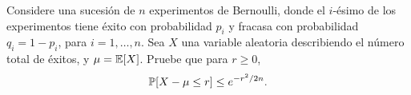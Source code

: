 \begin{statement}{31}
  Considere una sucesi\'on de $n$ experimentos de Bernoulli, donde el $i$-\'esimo de los experimentos
  tiene \'exito con probabilidad $p_i$ y fracasa con probabilidad $q_i = 1 - p_i$, para $i = 1, \dots, n$.
  Sea $X$ una variable aleatoria describiendo el n\'umero total de \'exitos, y $\mu = \mathbb{E}[X]$.
  Pruebe que para $r \geq 0$,
  \[
    \mathbb{P}[X - \mu \leq r] \leq e^{-r^2/2n}.
  \]
\end{statement}